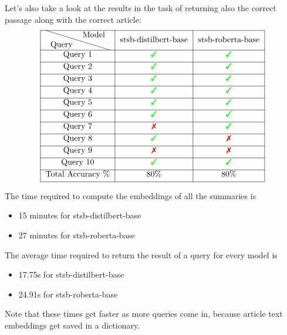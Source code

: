 \documentclass[12pt]{report}
\newcommand{\cmark}{\ding{51}}
\newcommand{\xmark}{\ding{55}}
\begin{document}
\noindent Let's also take a look at the results in the task of returning also the correct
passage along with the correct article: \bigskip
\[
    \begin{tabular}{|c|c|c|}
        \cline{1-3}
        \backslashbox{Query}{Model} & stsb-distilbert-base & stsb-roberta-base \\
        \cline{1-3}
        Query 1 & \textcolor{green}{\cmark} & \textcolor{green}{\cmark} \\[0.6ex]
        \cline{1-3}
        Query 2 & \textcolor{green}{\cmark} & \textcolor{green}{\cmark} \\[0.6ex]
        \cline{1-3}
        Query 3 & \textcolor{green}{\cmark} & \textcolor{green}{\cmark} \\[0.6ex]
        \cline{1-3}
        Query 4 & \textcolor{green}{\cmark} & \textcolor{green}{\cmark} \\[0.6ex]
        \cline{1-3}
        Query 5 & \textcolor{green}{\cmark} & \textcolor{green}{\cmark} \\[0.6ex]
        \cline{1-3}
        Query 6 & \textcolor{green}{\cmark} & \textcolor{green}{\cmark} \\[0.6ex]
        \cline{1-3}
        Query 7 & \textcolor{red}{\xmark} & \textcolor{green}{\cmark} \\[0.6ex]
        \cline{1-3}
        Query 8 & \textcolor{green}{\cmark} & \textcolor{red}{\xmark} \\[0.6ex]
        \cline{1-3}
        Query 9 & \textcolor{red}{\xmark} & \textcolor{red}{\xmark} \\[0.6ex]
        \cline{1-3}
        Query 10 & \textcolor{green}{\cmark} & \textcolor{green}{\cmark} \\[0.6ex]
        \cline{1-3}
        Total Accuracy \% & 80\% & 80\% \\[0.6ex]
        \cline{1-3}
    \end{tabular}
\] \bigskip

\noindent The time required to compute the embeddings of all the summaries is
\begin{itemize}
    \item 15 minutes for stsb-distilbert-base
    \item 27 minutes for stsb-roberta-base
\end{itemize} \bigskip

\noindent The average time required to return the result of a query for every model is
\begin{itemize}
    \item 17.75s for stsb-distilbert-base
    \item 24.91s for stsb-roberta-base
\end{itemize}
Note that these times get faster as more queries come in, because article text embeddings
get saved in a dictionary. \clearpage
\end{document}
